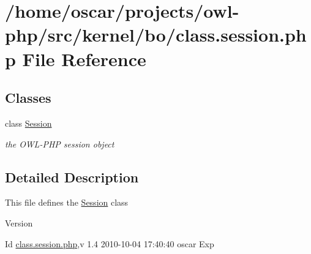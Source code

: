 \section{/home/oscar/projects/owl-\/php/src/kernel/bo/class.session.php File Reference}
\label{class_8session_8php}
\subsection*{Classes}
\begin{DoxyCompactItemize}
\item 
class \hyperlink{classSession}{Session}
\begin{DoxyCompactList}\small\item\em the OWL-\/PHP session object \item\end{DoxyCompactList}\end{DoxyCompactItemize}


\subsection{Detailed Description}
This file defines the \hyperlink{classSession}{Session} class \begin{DoxyVersion}{Version}

\end{DoxyVersion}
\begin{DoxyParagraph}{Id}
\hyperlink{class_8session_8php}{class.session.php},v 1.4 2010-\/10-\/04 17:40:40 oscar Exp 
\end{DoxyParagraph}
